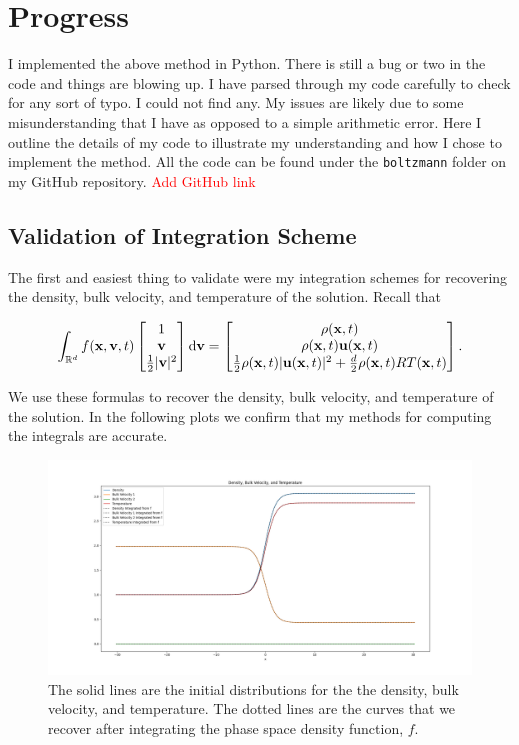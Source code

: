 \documentclass{article}
\def\t{\text}
\def\b{\textbf}
\begin{document}
\section{Progress}
I implemented the above method in Python. There is still a bug or two in the code and things are blowing up. I have parsed through my code carefully to check for any sort of typo. I could not find any. My issues are likely due to some misunderstanding that I have as opposed to a simple arithmetic error. Here I outline the details of my code to illustrate my understanding and how I chose to implement the method. All the code can be found under the \verb|boltzmann| folder on my GitHub repository. \textcolor{red}{Add GitHub link}
\subsection{Validation of Integration Scheme}
The first and easiest thing to validate were my integration schemes for recovering the density, bulk velocity, and temperature of the solution. Recall that 

\[
    \int_{\mathbb{R}^d} f(\b x, \b v, t)
    \begin{bmatrix}
        1 \\
        \b v \\
        \frac{1}{2} |\b v|^2
    \end{bmatrix}
    \t d \b v
    =
    \begin{bmatrix}
        \rho(\b x, t)\\
        \rho(\b x, t) \b u(\b x, t)\\
        \frac{1}{2} \rho(\b x, t) |\b u(\b x, t)|^2 + \frac{d}{2} \rho(\b x, t) R T(\b x, t)
    \end{bmatrix}.
\]

We use these formulas to recover the density, bulk velocity, and temperature of the solution. In the following plots we confirm that my methods for computing the integrals are accurate.

\begin{figure}[H]
    \centering
    \includegraphics[width = \textwidth]{imgs/initial_distributions.png}
    \caption{The solid lines are the initial distributions for the the density, bulk velocity, and temperature. The dotted lines are the curves that we recover after integrating the phase space density function, $f$.}
\end{figure}
\end{document}
